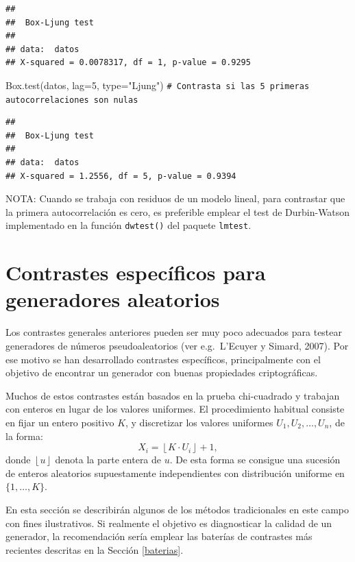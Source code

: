 \documentclass[
]{book}
\newenvironment{Shaded}{\begin{snugshade}}{\end{snugshade}}
\newcommand{\AttributeTok}[1]{\textcolor[rgb]{0.77,0.63,0.00}{#1}}
\newcommand{\CommentTok}[1]{\textcolor[rgb]{0.56,0.35,0.01}{\textit{#1}}}
\newcommand{\DecValTok}[1]{\textcolor[rgb]{0.00,0.00,0.81}{#1}}
\newcommand{\FunctionTok}[1]{\textcolor[rgb]{0.00,0.00,0.00}{#1}}
\newcommand{\NormalTok}[1]{#1}
\newcommand{\StringTok}[1]{\textcolor[rgb]{0.31,0.60,0.02}{#1}}
\theoremstyle{break}
\theoremstyle{nonumberplain}
\renewcommand{\CommentTok}[1]{\textcolor[rgb]{0.41,0.41,0.41}{\texttt{#1}}}
\begin{document}
\begin{verbatim}
## 
##  Box-Ljung test
## 
## data:  datos
## X-squared = 0.0078317, df = 1, p-value = 0.9295
\end{verbatim}

\begin{Shaded}
\begin{Highlighting}[]
\FunctionTok{Box.test}\NormalTok{(datos, }\AttributeTok{lag=}\DecValTok{5}\NormalTok{, }\AttributeTok{type=}\StringTok{"Ljung"}\NormalTok{) }\CommentTok{\# Contrasta si las 5 primeras autocorrelaciones son nulas}
\end{Highlighting}
\end{Shaded}

\begin{verbatim}
## 
##  Box-Ljung test
## 
## data:  datos
## X-squared = 1.2556, df = 5, p-value = 0.9394
\end{verbatim}

NOTA: Cuando se trabaja con residuos de un modelo lineal, para contrastar que la primera autocorrelación es cero, es preferible emplear el test de
Durbin-Watson implementado en la función \texttt{dwtest()} del paquete \texttt{lmtest}.

\hypertarget{contrastes-especuxedficos-para-generadores-aleatorios}{%
\section{Contrastes específicos para generadores aleatorios}\label{contrastes-especuxedficos-para-generadores-aleatorios}}

Los contrastes generales anteriores pueden ser muy poco adecuados para testear generadores de números pseudoaleatorios (ver e.g.~L'Ecuyer y Simard, 2007). Por ese motivo se han desarrollado contrastes específicos, principalmente con el objetivo de encontrar un generador con buenas propiedades criptográficas.

Muchos de estos contrastes están basados en la prueba chi-cuadrado y trabajan con enteros en lugar de los valores uniformes. El procedimiento habitual consiste en fijar un entero positivo \(K\), y discretizar los valores uniformes \(U_{1},U_{2},\ldots,U_{n}\), de la forma:
\[X_i = \left\lfloor K\cdot U_{i}\right\rfloor + 1 ,\]
donde \(\left\lfloor u\right\rfloor\) denota la parte entera de \(u\).
De esta forma se consigue una sucesión de enteros aleatorios supuestamente independientes con distribución uniforme en \(\{1, \ldots, K\}\).

En esta sección se describirán algunos de los métodos tradicionales en este campo con fines ilustrativos. Si realmente el objetivo es diagnosticar la calidad de un generador, la recomendación sería emplear las baterías de contrastes más recientes descritas en la Sección \ref{baterias}.
\end{document}
